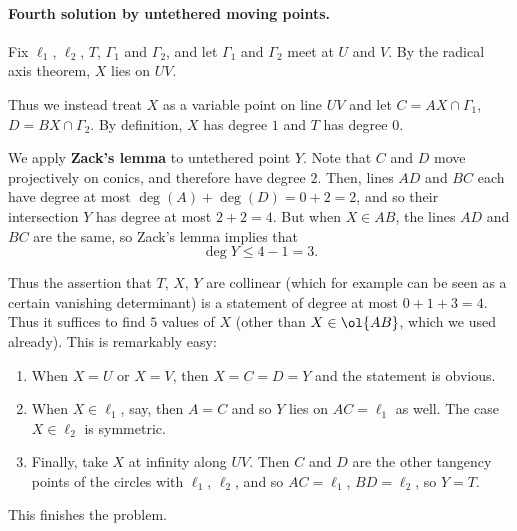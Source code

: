 \paragraph{Fourth solution by untethered moving points.}
Fix $\ell_1$, $\ell_2$, $T$, $\Gamma_1$ and $\Gamma_2$,
and let $\Gamma_1$ and $\Gamma_2$ meet at $U$ and $V$.
By the radical axis theorem, $X$ lies on $UV$.

Thus we instead treat $X$ as a variable point on line $UV$
and let $C = AX \cap \Gamma_1$, $D = BX \cap \Gamma_2$.
By definition, $X$ has degree $1$ and $T$ has degree $0$.

We apply \textbf{Zack's lemma} to untethered point $Y$.
Note that $C$ and $D$ move projectively on conics,
and therefore have degree $2$.
Then, lines $AD$ and $BC$ each have degree at most $\deg(A)+\deg(D)=0+2=2$,
and so their intersection $Y$ has degree at most $2+2=4$.
But when $X \in AB$, the lines $AD$ and $BC$ are the same,
so Zack's lemma implies that
\[ \deg Y \le 4 - 1 = 3. \]

Thus the assertion that $T$, $X$, $Y$ are collinear
(which for example can be seen as a certain vanishing determinant)
is a statement of degree at most $0+1+3=4$.
Thus it suffices to find $5$ values of $X$
(other than $X \in \ol{AB}$, which we used already).
This is remarkably easy:
\begin{enumerate}
    \item When $X=U$ or $X=V$, then $X=C=D=Y$ and the statement is obvious.
    \item When $X \in \ell_1$, say, then $A=C$ and so $Y$ lies on $AC=\ell_1$ as well.
    The case $X \in \ell_2$ is symmetric.
    \item Finally, take $X$ at infinity along $UV$.
    Then $C$ and $D$ are the other tangency points
    of the circles with $\ell_1$, $\ell_2$, and so $AC=\ell_1$, $BD=\ell_2$, so $Y=T$.
\end{enumerate}
This finishes the problem.
